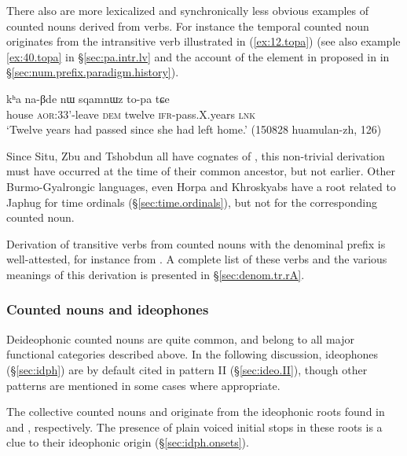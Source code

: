 There also are more lexicalized and synchronically less obvious examples of counted nouns derived from verbs. For instance the temporal counted noun  originates from the intransitive verb   illustrated in (\ref{ex:12.topa}) (see also example \ref{ex:40.topa}  in §\ref{sec:pa.intr.lv} and the account of the  element in  proposed in in §\ref{sec:num.prefix.paradigm.history}). 

\begin{exe}
\ex \label{ex:12.topa} 
\gll kʰa na-βde nɯ sqamnɯz to-pa tɕe \\ 
house \textsc{aor}:3\fl{}3'-leave \textsc{dem} twelve  \textsc{ifr}-pass.X.years \textsc{lnk} \\
\glt `Twelve years had passed since she had left home.' (150828 huamulan-zh, 126)
\end{exe}

Since Situ, Zbu and Tshobdun all have cognates of , this non-trivial derivation must have occurred at the time of their common ancestor, but not earlier. Other Burmo-Gyalrongic languages, even Horpa and Khroskyabs \citep{jacques17stau} have a root related to Japhug  for time ordinals (§\ref{sec:time.ordinals}), but not for the corresponding counted noun. 
  
Derivation of transitive verbs from counted nouns with the denominal prefix  is well-attested, for instance  from . A complete list of these verbs and the various meanings of this derivation is presented in  §\ref{sec:denom.tr.rA}.
 
\subsubsection{Counted nouns and ideophones}   \label{sec:CN.ideophones}
Deideophonic counted nouns are quite common, and belong to all major functional categories described above. In the following discussion, ideophones (§\ref{sec:idph}) are by default cited in pattern II (§\ref{sec:ideo.II}), though other patterns are mentioned in some cases where appropriate.

The collective counted nouns  and  originate from the ideophonic roots found in  and , respectively. The presence of plain voiced initial stops in these roots is a clue to their ideophonic origin (§\ref{sec:idph.onsets}).

